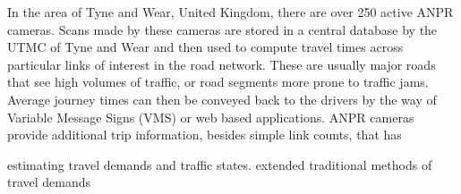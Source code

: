 In the area of Tyne and Wear, United Kingdom, there are over 250 active ANPR cameras. Scans made by these cameras are stored in a central database by the UTMC of Tyne and Wear and then used to compute travel times across particular links of interest in the road network. These are usually major roads that see high volumes of traffic, or road segments more prone to traffic jams. Average journey times can then be conveyed back to the drivers by the way of Variable Message Signs (VMS) or web based applications. ANPR cameras provide additional trip information, besides simple link counts, that has

 estimating travel demands and traffic states. extended traditional methods of  travel demands
